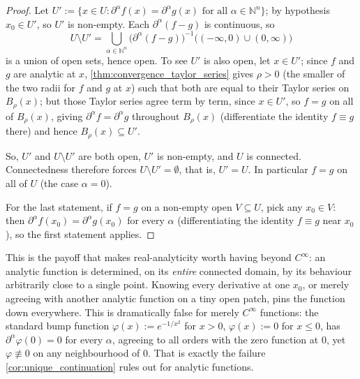 \begin{proof}
Let $U' := \{x \in U : \partial^\alpha f(x) = \partial^\alpha g(x) \text{ for all } \alpha \in
\mathbb{N}^n\}$; by hypothesis $x_0 \in U'$, so $U'$ is non-empty. Each $\partial^\alpha(f-g)$ is
continuous, so
\[U \setminus U' = \bigcup_{\alpha \in \mathbb{N}^n} \big(\partial^\alpha(f-g)\big)^{-1}\big((-\infty,0)\cup(0,\infty)\big)\]
is a union of open sets, hence open. To see $U'$ is also open, let $x \in U'$; since $f$ and $g$
are analytic at $x$, \cref{thm:convergence_taylor_series} gives $\rho>0$ (the smaller of the two
radii for $f$ and $g$ at $x$) such that both are equal to their Taylor series on $B_\rho(x)$; but
those Taylor series agree term by term, since $x \in U'$, so $f=g$ on all of $B_\rho(x)$, giving
$\partial^\alpha f = \partial^\alpha g$ throughout $B_\rho(x)$ (differentiate the identity
$f\equiv g$ there) and hence $B_\rho(x) \subseteq U'$.

So, $U'$ and $U\setminus U'$ are both open, $U'$ is non-empty, and $U$ is connected. Connectedness
therefore forces $U \setminus U' = \emptyset$, that is, $U' = U$. In particular $f = g$ on all of
$U$ (the case
$\alpha = 0$).

For the last statement, if $f=g$ on a non-empty open $V \subseteq U$, pick any $x_0 \in V$: then
$\partial^\alpha f(x_0) = \partial^\alpha g(x_0)$ for every $\alpha$ (differentiating the
identity $f \equiv g$ near $x_0$), so the first statement applies.
\end{proof}

\begin{remark}
This is the payoff that makes real-analyticity worth having beyond $C^\infty$: an analytic
function is determined, on its \emph{entire} connected domain, by its behaviour arbitrarily close
to a single point. Knowing every derivative at one $x_0$, or merely agreeing with another
analytic function on a tiny open patch, pins the function down everywhere. This is dramatically
false for merely $C^\infty$ functions: the standard bump function
$\varphi(x) := e^{-1/x^2}$ for $x>0$, $\varphi(x):=0$ for $x\leq0$, has $\partial^\alpha
\varphi(0) = 0$ for every $\alpha$, agreeing to all orders with the zero function at $0$, yet
$\varphi \not\equiv 0$ on any neighbourhood of $0$. That is exactly the failure
\cref{cor:unique_continuation} rules out for analytic functions.
\end{remark}
